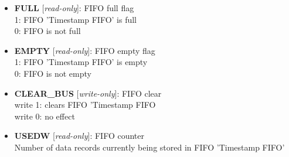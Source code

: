 \vspace{12pt}
\noindent
{}

\begin{itemize}
\item \begin{small}
{\bf 
FULL
} [\emph{read-only}]: FIFO full flag
\\
1: FIFO 'Timestamp FIFO' is full\\0: FIFO is not full
\end{small}
\item \begin{small}
{\bf 
EMPTY
} [\emph{read-only}]: FIFO empty flag
\\
1: FIFO 'Timestamp FIFO' is empty\\0: FIFO is not empty
\end{small}
\item \begin{small}
{\bf 
CLEAR\_BUS
} [\emph{write-only}]: FIFO clear
\\
write 1: clears FIFO 'Timestamp FIFO\\write 0: no effect
\end{small}
\item \begin{small}
{\bf 
USEDW
} [\emph{read-only}]: FIFO counter
\\
Number of data records currently being stored in FIFO 'Timestamp FIFO'
\end{small}
\end{itemize}



